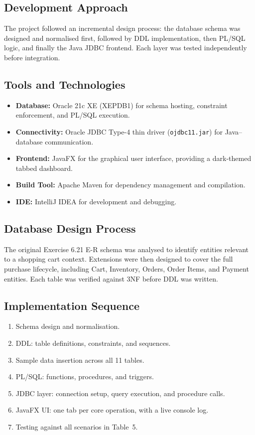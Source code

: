 \subsection{Development Approach}
The project followed an incremental design process: the database schema was
designed and normalised first, followed by DDL implementation, then PL/SQL
logic, and finally the Java JDBC frontend. Each layer was tested independently
before integration.

\subsection{Tools and Technologies}
\begin{itemize}
    \item \textbf{Database:} Oracle 21c XE (XEPDB1) for schema hosting,
          constraint enforcement, and PL/SQL execution.
    \item \textbf{Connectivity:} Oracle JDBC Type-4 thin driver
          (\texttt{ojdbc11.jar}) for Java--database communication.
    \item \textbf{Frontend:} JavaFX for the graphical user interface,
          providing a dark-themed tabbed dashboard.
    \item \textbf{Build Tool:} Apache Maven for dependency management
          and compilation.
    \item \textbf{IDE:} IntelliJ IDEA for development and debugging.
\end{itemize}

\subsection{Database Design Process}
The original Exercise 6.21 E-R schema was analysed to identify entities
relevant to a shopping cart context. Extensions were then designed to cover
the full purchase lifecycle, including Cart, Inventory, Orders, Order Items,
and Payment entities. Each table was verified against 3NF before DDL was
written.

\subsection{Implementation Sequence}
\begin{enumerate}
    \item Schema design and normalisation.
    \item DDL: table definitions, constraints, and sequences.
    \item Sample data insertion across all 11 tables.
    \item PL/SQL: functions, procedures, and triggers.
    \item JDBC layer: connection setup, query execution, and procedure calls.
    \item JavaFX UI: one tab per core operation, with a live console log.
    \item Testing against all scenarios in Table~5.
\end{enumerate}

